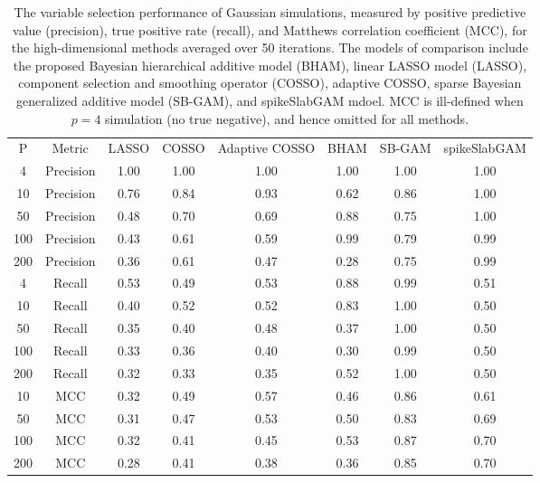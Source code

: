 \begin{table}[ht]
\centering
\begin{tabular}{cccccccc}
 P & Metric & LASSO & COSSO & Adaptive COSSO & BHAM & SB-GAM & spikeSlabGAM \\ 
   4 & Precision & 1.00 & 1.00 & 1.00 & 1.00 & 1.00 & 1.00 \\ 
   10 & Precision & 0.76 & 0.84 & 0.93 & 0.62 & 0.86 & 1.00 \\ 
   50 & Precision & 0.48 & 0.70 & 0.69 & 0.88 & 0.75 & 1.00 \\ 
  100 & Precision & 0.43 & 0.61 & 0.59 & 0.99 & 0.79 & 0.99 \\ 
  200 & Precision & 0.36 & 0.61 & 0.47 & 0.28 & 0.75 & 0.99 \\ 
   \hline
  4 & Recall & 0.53 & 0.49 & 0.53 & 0.88 & 0.99 & 0.51 \\ 
   10 & Recall & 0.40 & 0.52 & 0.52 & 0.83 & 1.00 & 0.50 \\ 
   50 & Recall & 0.35 & 0.40 & 0.48 & 0.37 & 1.00 & 0.50 \\ 
  100 & Recall & 0.33 & 0.36 & 0.40 & 0.30 & 0.99 & 0.50 \\ 
  200 & Recall & 0.32 & 0.33 & 0.35 & 0.52 & 1.00 & 0.50 \\ 
   \hline
 10 & MCC & 0.32 & 0.49 & 0.57 & 0.46 & 0.86 & 0.61 \\ 
   50 & MCC & 0.31 & 0.47 & 0.53 & 0.50 & 0.83 & 0.69 \\ 
  100 & MCC & 0.32 & 0.41 & 0.45 & 0.53 & 0.87 & 0.70 \\ 
  200 & MCC & 0.28 & 0.41 & 0.38 & 0.36 & 0.85 & 0.70 \\ 
  \end{tabular}
\caption{The variable selection performance of Gaussian simulations,
                         measured by positive predictive value (precision), true positive rate (recall),
                         and Matthews correlation coefficient (MCC), for the high-dimensional methods
                         averaged over 50 iterations. The models of comparison include the proposed Bayesian
                         hierarchical additive model (BHAM), linear LASSO model (LASSO), component selection
                         and smoothing operator (COSSO), adaptive COSSO, sparse Bayesian generalized additive
                         model (SB-GAM), and spikeSlabGAM mdoel. MCC is ill-defined when $p=4$ simulation
                         (no true negative), and hence omitted for all methods.} 
\label{tab:sim_gaus_var_select}
\end{table}
